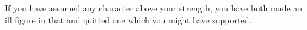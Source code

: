 If you have assumed any character above your strength, you have
both made an ill figure in that and quitted one which you might have
supported. 
